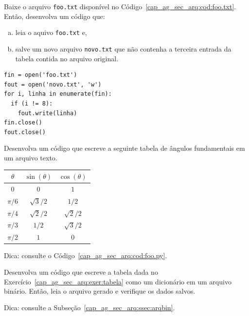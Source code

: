 \begin{exer}
  Baixe o arquivo \texttt{foo.txt} disponível no Código~\ref{cap_ag_sec_arq:cod:foo.txt}. Então, desenvolva um código que:
  \begin{enumerate}[a)]
  \item leia o aquivo \texttt{foo.txt} e,
  \item salve um novo arquivo \texttt{novo.txt} que não contenha a terceira entrada da tabela contida no arquivo original.
  \end{enumerate}
\end{exer}
\begin{resp}

\begin{lstlisting}
fin = open('foo.txt')
fout = open('novo.txt', 'w')
for i, linha in enumerate(fin):
  if (i != 8):
    fout.write(linha)
fin.close()
fout.close()
\end{lstlisting}

\end{resp}

\begin{exer}\label{cap_ag_sec_arq:exer:tabela}
  Desenvolva um código que escreve a seguinte tabela de ângulos fundamentais em um arquivo texto.
  \begin{center}
    \begin{tabular}{c|cc} \toprule
      $\theta$ & $\sin(\theta)$ & $\cos(\theta)$\\ \midrule
      $0$      & $0$          & $1$\\
      $\pi/6$  & $\sqrt{3}/2$ & $1/2$\\
      $\pi/4$  & $\sqrt{2}/2$ & $\sqrt{2}/2$\\
      $\pi/3$  & $1/2$        & $\sqrt{3}/2$\\
      $\pi/2$  & $1$          & $0$\\ \bottomrule
    \end{tabular}
  \end{center}
\end{exer}
\begin{resp}
  Dica: consulte o Código~\ref{cap_ag_sec_arq:cod:foo.py}.
\end{resp}

\begin{exer}
  Desenvolva um código que escreve a tabela dada no Exercício~\ref{cap_ag_sec_arq:exer:tabela} como um dicionário em um arquivo binário. Então, leia o arquivo gerado e verifique os dados salvos.
\end{exer}
\begin{resp}
  Dica: consulte a Subseção~\ref{cap_ag_sec_arq:ssec:arqbin}.
\end{resp}

